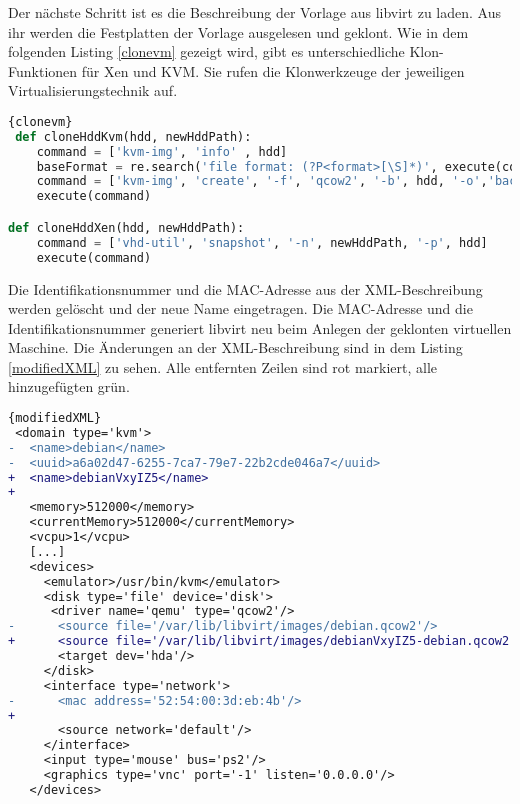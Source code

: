 Der nächste Schritt ist es die Beschreibung der Vorlage aus libvirt zu laden. Aus ihr werden die Festplatten der Vorlage ausgelesen und geklont. Wie in dem folgenden Listing \ref{clonevm} gezeigt wird, gibt es unterschiedliche Klon-Funktionen für Xen und KVM. Sie rufen die Klonwerkzeuge der jeweiligen Virtualisierungstechnik auf.
\\
\begin{lstlisting}[caption=VM-Auswahl,language=Python, label=clonevm]{clonevm}
 def cloneHddKvm(hdd, newHddPath):
	command = ['kvm-img', 'info' , hdd]
	baseFormat = re.search('file format: (?P<format>[\S]*)', execute(command)).groupdict()['format']
	command = ['kvm-img', 'create', '-f', 'qcow2', '-b', hdd, '-o','backing_fmt=' + baseFormat, newHddPath]
	execute(command)

def cloneHddXen(hdd, newHddPath):
	command = ['vhd-util', 'snapshot', '-n', newHddPath, '-p', hdd]
	execute(command)
\end{lstlisting}

Die Identifikationsnummer und die MAC-Adresse aus der XML-Beschreibung werden gelöscht und der neue Name eingetragen. Die MAC-Adresse und die Identifikationsnummer generiert libvirt neu beim Anlegen der geklonten virtuellen Maschine. Die Änderungen an der XML-Beschreibung sind in dem Listing \ref{modifiedXML} zu sehen. Alle entfernten Zeilen sind rot markiert, alle hinzugefügten grün.
\\
\begin{lstlisting}[caption=modifizierte XML-Beschreibung,language=diff,label=modifiedXML]{modifiedXML}
 <domain type='kvm'>
-  <name>debian</name>
-  <uuid>a6a02d47-6255-7ca7-79e7-22b2cde046a7</uuid>
+  <name>debianVxyIZ5</name>
+  
   <memory>512000</memory>
   <currentMemory>512000</currentMemory>
   <vcpu>1</vcpu>
   [...]
   <devices>
     <emulator>/usr/bin/kvm</emulator>
     <disk type='file' device='disk'>
      <driver name='qemu' type='qcow2'/>
-      <source file='/var/lib/libvirt/images/debian.qcow2'/>
+      <source file='/var/lib/libvirt/images/debianVxyIZ5-debian.qcow2'/>
       <target dev='hda'/>
     </disk>
     <interface type='network'>
-      <mac address='52:54:00:3d:eb:4b'/>
+      
       <source network='default'/>
     </interface>
     <input type='mouse' bus='ps2'/>
     <graphics type='vnc' port='-1' listen='0.0.0.0'/>
   </devices>
\end{lstlisting}

